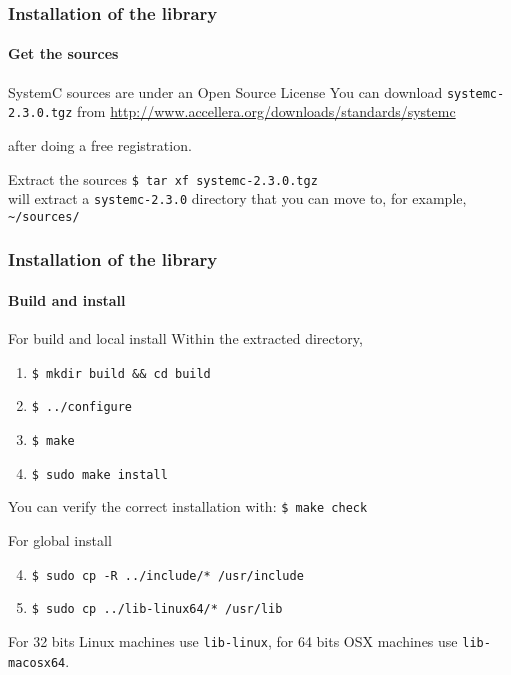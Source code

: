 \begin{frame}
\frametitle{Installation of the library}
\framesubtitle{Get the sources}

\begin{block}{SystemC sources are under an Open Source License}
You can download \texttt{systemc-2.3.0.tgz} from 
{ \scriptsize
\url{http://www.accellera.org/downloads/standards/systemc}
}
\medskip 

after doing a free registration.
\end{block}
\begin{block}{Extract the sources}
\texttt{\$ tar xf systemc-2.3.0.tgz} \\
will extract a \texttt{systemc-2.3.0} directory that you can move to, for example,
\texttt{\textasciitilde{}/sources/}
\end{block}

\end{frame}

\begin{frame}
\frametitle{Installation of the library}
\framesubtitle{Build and install}

\begin{block}{For build and local install}
Within the extracted directory,
\begin{enumerate}
\item \texttt{\$ mkdir build \&\& cd build}
\item \texttt{\$ ../configure}
\item \texttt{\$ make}
\item \texttt{\$ sudo make install}
\end{enumerate}
You can verify the correct installation with: \texttt{\$ make check}
\end{block}
\pause
\begin{block}{For global install}
\begin{enumerate}
\setcounter{enumi}{3}
\item \texttt{\$ sudo cp -R ../include/* /usr/include}
\item \texttt{\$ sudo cp ../lib-linux64/* /usr/lib}
\end{enumerate}
For 32 bits Linux machines use \texttt{lib-linux}, for 64 bits OSX machines use \texttt{lib-macosx64}.
\end{block}

\end{frame}

